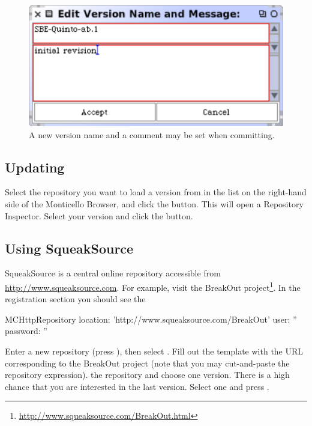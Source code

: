 \documentclass[a4paper,10pt,twoside]{book}
\begin{document}
\begin{figure}[ht]\centering
	\includegraphics[width=.55\linewidth]{saving.png}
	\caption{A new version name and a comment may be set when committing.}
\end{figure}

\subsection{Updating}

Select the repository you want to load a version from in the list on the right-hand side of the Monticello Browser, and click the  button. This will open a Repository Inspector. Select your version and click the  button.


\subsection{Using SqueakSource}

SqueakSource is a central online repository accessible from \url{http://www.squeaksource.com}. For example, visit the BreakOut project\footnote{\url{http://www.squeaksource.com/BreakOut.html}}. In the registration section you should see the 

\begin{code}
MCHttpRepository
    location: 'http://www.squeaksource.com/BreakOut'
    user: ''
    password: ''
\end{code}

Enter a new repository (press ), then select . Fill out the template with the URL corresponding to the BreakOut project (note that you may cut-and-paste the repository expression).
 the repository and choose one version. There is a high chance that you are interested in the last version. Select one and press .
\end{document}
